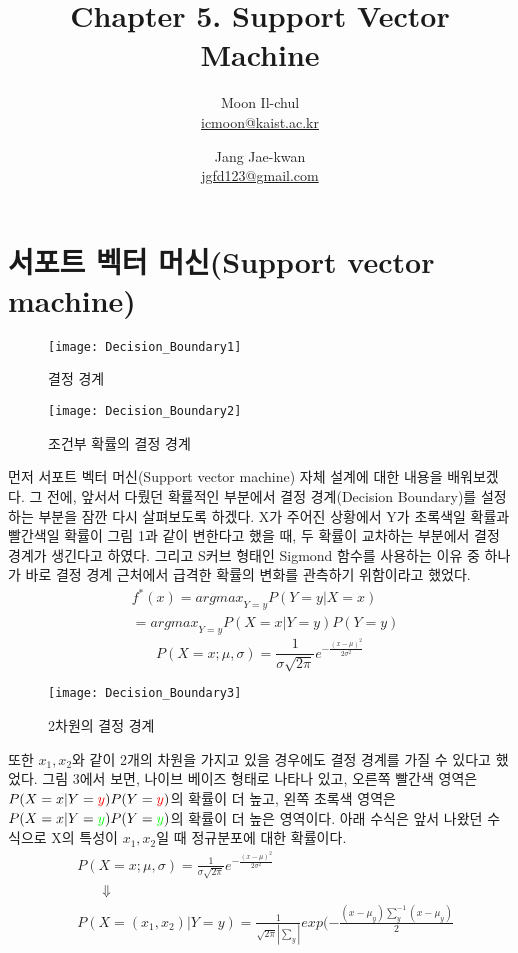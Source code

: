 \documentclass[a4paper]{oblivoir}
\author{Moon Il-chul \\ \href{mailto:icmoon@kaist.ac.kr}{icmoon@kaist.ac.kr} 
   \and Jang Jae-kwan \\ \href{mailto:jgfd123@gmail.com}{jgfd123@gmail.com} }
\title{Chapter 5. Support Vector Machine}
\begin{document}
\maketitle
\tableofcontents

\section{서포트 벡터 머신(Support vector machine)}

\begin{figure}[ht]\centering
\texttt{[image: Decision\_Boundary1]}\caption{결정 경계}\label{Fig:5-1}
\end{figure}
\begin{figure}[ht]\centering
\texttt{[image: Decision\_Boundary2]}\caption{조건부 확률의 결정 경계}\label{Fig:5-2}
\end{figure}
\indent 먼저 서포트 벡터 머신(Support vector machine) 자체 설계에 대한 내용을 배워보겠다. 그 전에, 앞서서 다뤘던 확률적인 부분에서 결정 경계(Decision Boundary)를 설정하는 부분을 잠깐 다시 살펴보도록 하겠다. X가 주어진 상황에서 Y가 초록색일 확률과 빨간색일 확률이 그림 1과 같이 변한다고 했을 때, 두 확률이 교차하는 부분에서 결정 경계가 생긴다고 하였다. 그리고 S커브 형태인 Sigmond 함수를 사용하는 이유 중 하나가 바로 결정 경계 근처에서 급격한 확률의 변화를 관측하기 위함이라고 했었다.  
\begin{equation}
\begin{split}
&f^*(x)={argmax}_{Y=y}P(Y=y|X=x)\\
&={argmax}_{Y=y} P(X=x|Y=y)P(Y=y)
\end{split}
\label{eq:5-1}
\end{equation}
\begin{equation}
P(X=x;\mu ,\sigma)=\frac{1}{\sigma\sqrt{2\pi}}e^{-\frac{(x-\mu)^2}{2\sigma^2}}
\label{eq:5-2}
\end{equation}

\begin{figure}[ht]\centering
\texttt{[image: Decision\_Boundary3]}\caption{2차원의 결정 경계}\label{Fig:5-3}
\end{figure}
\indent 또한 $x_1,x_2$와 같이 2개의 차원을 가지고 있을 경우에도 결정 경계를 가질 수 있다고 했었다. 그림 3에서 보면, 나이브 베이즈 형태로 나타나 있고, 오른쪽 빨간색 영역은 $P(X=x|Y=\textcolor{red}{y})P(Y=\textcolor{red}{y})$의 확률이 더 높고, 왼쪽 초록색 영역은 $P(X=x|Y=\textcolor{green}{y})P(Y=\textcolor{green}{y})$의 확률이 더 높은 영역이다. 아래 수식은 앞서 나왔던 수식으로 X의 특성이 $x_1,x_2$일 때 정규분포에 대한 확률이다.
\begin{equation}
\begin{split}
&P(X=x;\mu ,\sigma)=\frac{1}{\sigma\sqrt{2\pi}}e^{-\frac{(x-\mu)^2}{2\sigma^2}}\\
&\ \ \ \ \ \ \ \ \Downarrow\\
&P(X=(x_1,x_2)|Y=y)=\frac{1}{\sqrt{2\pi}| \sum_y |}exp(-\frac{(x-\mu_y)\sum_{y}^{-1}(x-\mu_y)}{2}
\end{split}
\end{equation}
\\
\end{document}

